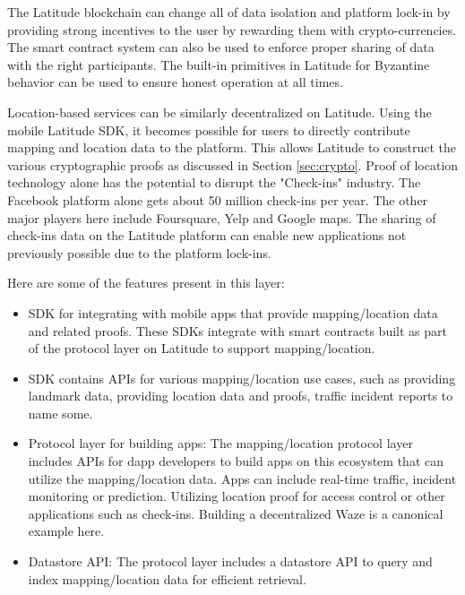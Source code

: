 The Latitude blockchain can change all of data isolation and platform lock-in by providing strong incentives to the user
by rewarding them with crypto-currencies. The smart contract system can also be used to enforce proper sharing of data
with the right participants. The built-in primitives in Latitude for Byzantine behavior can be used to ensure honest
operation at all times.

Location-based services can be similarly decentralized on Latitude. Using the mobile Latitude SDK, it becomes possible
for users to directly contribute mapping and location data to the platform. This allows Latitude to construct the
various cryptographic proofs as discussed in Section \ref{sec:crypto}. Proof of location technology alone has the
potential to disrupt the "Check-ins" industry. The Facebook platform alone gets about 50 million check-ins per year. The
other major players here include Foursquare, Yelp and Google maps. The sharing of check-ins data on the Latitude
platform can enable new applications not previously possible due to the platform lock-ins.

Here are some of the features present in this layer:

\begin{itemize}
    \item SDK for integrating with mobile apps that provide mapping/location data and related proofs. These SDKs
        integrate with smart contracts built as part of the protocol layer on Latitude to support mapping/location.
    \item SDK contains APIs for various mapping/location use cases, such as providing landmark data, providing location
        data and proofs, traffic incident reports to name some.
    \item Protocol layer for building apps: The mapping/location protocol layer includes APIs for dapp developers to
        build apps on this ecosystem that can utilize the mapping/location data. Apps can include real-time traffic,
        incident monitoring or prediction. Utilizing location proof for access control or other applications such as
        check-ins. Building a decentralized Waze is a canonical example here.
    \item Datastore API: The protocol layer includes a datastore API to query and index mapping/location data for
        efficient retrieval.
\end{itemize}


